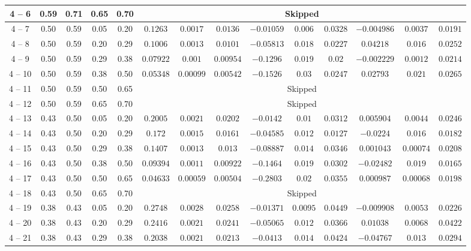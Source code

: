 \begin{longtable}{|*{14}{c|}}
\hline
4 -- 6 & 0.59 & 0.71 & 0.65 & 0.70 & \multicolumn{9}{c|}{Skipped} \\
\hline
4 -- 7 & 0.50 & 0.59 & 0.05 & 0.20 & $0.1263$ & $0.0017$ & $0.0136$ & $-0.01059$ & $0.006$ & $0.0328$ & $-0.004986$ & $0.0037$ & $0.0191$ \\
\hline
4 -- 8 & 0.50 & 0.59 & 0.20 & 0.29 & $0.1006$ & $0.0013$ & $0.0101$ & $-0.05813$ & $0.018$ & $0.0227$ & $0.04218$ & $0.016$ & $0.0252$ \\
\hline
4 -- 9 & 0.50 & 0.59 & 0.29 & 0.38 & $0.07922$ & $0.001$ & $0.00954$ & $-0.1296$ & $0.019$ & $0.02$ & $-0.002229$ & $0.0012$ & $0.0214$ \\
\hline
4 -- 10 & 0.50 & 0.59 & 0.38 & 0.50 & $0.05348$ & $0.00099$ & $0.00542$ & $-0.1526$ & $0.03$ & $0.0247$ & $0.02793$ & $0.021$ & $0.0265$ \\
\hline
4 -- 11 & 0.50 & 0.59 & 0.50 & 0.65 & \multicolumn{9}{c|}{Skipped} \\
\hline
4 -- 12 & 0.50 & 0.59 & 0.65 & 0.70 & \multicolumn{9}{c|}{Skipped} \\
\hline
4 -- 13 & 0.43 & 0.50 & 0.05 & 0.20 & $0.2005$ & $0.0021$ & $0.0202$ & $-0.0142$ & $0.01$ & $0.0312$ & $0.005904$ & $0.0044$ & $0.0246$ \\
\hline
4 -- 14 & 0.43 & 0.50 & 0.20 & 0.29 & $0.172$ & $0.0015$ & $0.0161$ & $-0.04585$ & $0.012$ & $0.0127$ & $-0.0224$ & $0.016$ & $0.0182$ \\
\hline
4 -- 15 & 0.43 & 0.50 & 0.29 & 0.38 & $0.1407$ & $0.0013$ & $0.013$ & $-0.08887$ & $0.014$ & $0.0346$ & $0.001043$ & $0.00074$ & $0.0208$ \\
\hline
4 -- 16 & 0.43 & 0.50 & 0.38 & 0.50 & $0.09394$ & $0.0011$ & $0.00922$ & $-0.1464$ & $0.019$ & $0.0302$ & $-0.02482$ & $0.019$ & $0.0165$ \\
\hline
4 -- 17 & 0.43 & 0.50 & 0.50 & 0.65 & $0.04633$ & $0.00059$ & $0.00504$ & $-0.2803$ & $0.02$ & $0.0355$ & $0.000987$ & $0.00068$ & $0.0198$ \\
\hline
4 -- 18 & 0.43 & 0.50 & 0.65 & 0.70 & \multicolumn{9}{c|}{Skipped} \\
\hline
4 -- 19 & 0.38 & 0.43 & 0.05 & 0.20 & $0.2748$ & $0.0028$ & $0.0258$ & $-0.01371$ & $0.0095$ & $0.0449$ & $-0.009908$ & $0.0053$ & $0.0226$ \\
\hline
4 -- 20 & 0.38 & 0.43 & 0.20 & 0.29 & $0.2416$ & $0.0021$ & $0.0241$ & $-0.05065$ & $0.012$ & $0.0366$ & $0.01038$ & $0.0068$ & $0.0422$ \\
\hline
4 -- 21 & 0.38 & 0.43 & 0.29 & 0.38 & $0.2038$ & $0.0021$ & $0.0213$ & $-0.0413$ & $0.014$ & $0.0424$ & $-0.04767$ & $0.013$ & $0.0294$ \\

\end{longtable}
